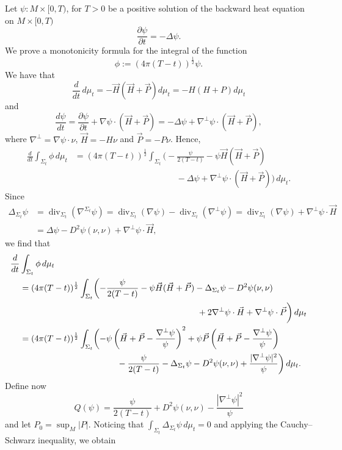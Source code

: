 \documentclass[11pt]{amsart}
\DeclareMathOperator{\dvg}{div} \DeclareMathOperator{\spt}{spt}
\def\dmt{\,d\mu_t}
\begin{document}
Let $\psi:M\times [0,T)$, for $T>0$ be a positive solution of the backward heat equation on $M\times [0,T)$ \[\frac{\partial\psi}{\partial t}=-\Delta\psi.\]
We prove a monotonicity formula for the integral of the function
\[\phi:=(4\pi (T-t))^\frac12\psi.\]
We have that
\begin{equation*}\frac{d}{dt}\dmt=-\vec H(\vec H+\vec P) d\mu_t=-H(H+P) d\mu_t
\end{equation*}
and 
\[\frac{d\psi}{dt}=\frac{\partial\psi}{\partial t}+\nabla\psi\cdot (\vec H+\vec P)=-\Delta \psi+\nabla^\bot\psi\cdot (\vec H+\vec P),\]
where $\nabla^\bot= \nabla\psi\cdot \nu$, $\vec H=-H\nu$ and $\vec P=-P\nu$. Hence,
\[
\begin{split}\frac{d}{dt} \int_{\Sigma_t}\phi\dmt&= (4\pi (T-t))^\frac12\int_{\Sigma_t}\bigg(-\frac{\psi}{2(T-t)}-\psi \vec H(\vec H+\vec P)\\
&\hspace{5cm}-\Delta \psi +\nabla^\bot\psi\cdot (\vec H+\vec P)\bigg)\dmt.\end{split}
\]
Since
\[\begin{split}\Delta_{\Sigma_t}\psi&=\dvg_{\Sigma_t}(\nabla^{\Sigma_t}\psi)=\dvg_{\Sigma_t}(\nabla\psi)-\dvg_{\Sigma_t}(\nabla^\bot\psi)= \dvg_{\Sigma_t}(\nabla\psi)+\nabla^\bot\psi\cdot \vec H\\
&=\Delta\psi- D^2\psi(\nu, \nu)+ \nabla^\bot\psi\cdot \vec H,
\end{split}\]
we find that
\[\begin{split}\frac{d}{dt}&\int_{\Sigma_t}\phi\dmt\\
&= (4\pi (T-t))^\frac12\int_{\Sigma_t}\biggl(-\frac{\psi}{2(T-t)}-\psi \vec H(\vec H+\vec P)-\Delta_{\Sigma_t} \psi-D^2\psi(\nu,\nu)\\
& \hspace{7.3cm}+2\nabla^\bot\psi\cdot \vec H+\nabla^\bot\psi\cdot\vec P\biggr)\dmt\\
&=(4\pi (T-t))^\frac12\int_{\Sigma_t}\biggl(-\psi\left(\vec H+\vec P-\frac{\nabla^\bot \psi}{\psi}\right)^2+\psi  \vec P\left( \vec H+\vec P-\frac{\nabla^\bot\psi}{\psi}\right)\\
&\hspace{4cm}-\frac{\psi}{2(T-t)}-\Delta_{\Sigma_t} \psi-D^2\psi(\nu,\nu)+\frac{|\nabla^\bot\psi|^2}{\psi} \biggr)\dmt.\end{split}\]
Define now
\[Q(\psi)= \frac{\psi}{2(T-t)}+D^2\psi(\nu,\nu)- \frac{|\nabla^\bot\psi|^2}{\psi}\]
and let $P_0=\sup_M|P|$. Noticing that $\int_{\Sigma_t}\Delta_{\Sigma_t}\psi\dmt=0$ and applying the Cauchy--Schwarz inequality, we obtain
\end{document}
